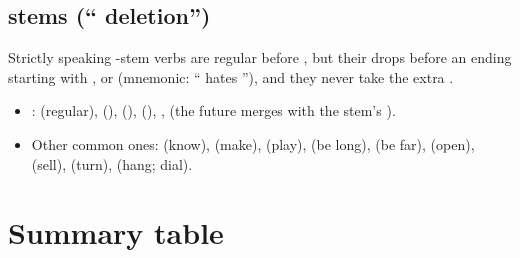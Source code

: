 \subsection{ stems (`` deletion'')}

Strictly speaking -stem verbs are regular before , but their
 drops before an ending starting with ,  or  (mnemonic:
`` hates ''), and they never take the extra .
\begin{itemize}
  \item {}:  (regular),  (), 
        (),  (), ,  (the future
         merges with the stem's ).
  \item Other common ones:  (know),  (make),  (play),
         (be long),  (be far),  (open),  (sell),
         (turn),  (hang; dial).
\end{itemize}

\section{Summary table}

